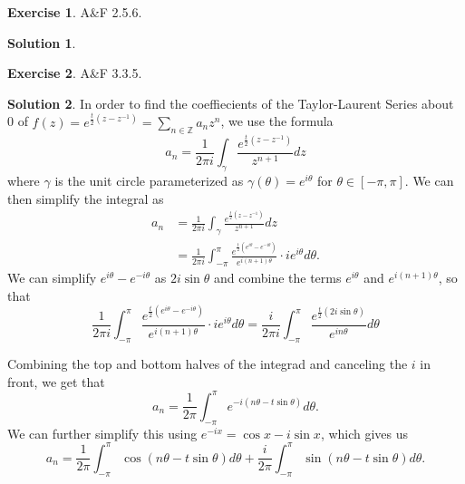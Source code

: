 \documentclass[12pt]{article}
\newcommand{\bbZ}{\mathbb{Z}}
\theoremstyle{definition}
\newtheorem{exer}{Exercise}
\newtheorem{sol}{Solution}
\theoremstyle{remark}
\begin{document}
\newpage

\begin{exer}
    A\&F 2.5.6.
\end{exer}
\begin{sol}

\end{sol}
\newpage

\begin{exer}
    A\&F 3.3.5.
\end{exer}

\begin{sol}
    In order to find the coeffiecients of the Taylor-Laurent Series about 0 of $f(z) = e^{\frac{t}{2}(z - z^{-1})} = \sum_{n\in\bbZ} a_n z^n$, we use the formula
    \begin{equation}
        a_n = \frac{1}{2\pi i} \int_\gamma \frac{ e^{\frac{t}{2}(z - z^{-1})}}{z^{n+1}} dz
    \end{equation}
    where $\gamma$ is the unit circle parameterized as $\gamma(\theta) = e^{i\theta}$ for $\theta \in [-\pi, \pi]$. We can then simplify the integral as
    \begin{align}
        a_n &= \frac{1}{2\pi i} \int_\gamma \frac{ e^{\frac{t}{2}(z - z^{-1})}}{z^{n+1}} dz\\
            &= \frac{1}{2\pi i} \int_{-\pi}^{\pi} \frac{e^{\frac{t}{2}( e^{i\theta} - e^{-i\theta} )}  }{ e^{i(n+1)\theta} } \cdot ie^{i\theta}d\theta.
    \end{align}
    We can simplify $e^{i\theta} - e^{-i\theta}$ as $2i\sin\theta$ and combine the terms $e^{i\theta}$ and $e^{i(n+1) \theta}$, so that
\begin{equation}
  \frac{1}{2\pi i} \int_{-\pi}^{\pi} \frac{e^{\frac{t}{2}( e^{i\theta} - e^{-i\theta} )}  }{ e^{i(n+1)\theta} } \cdot ie^{i\theta}d\theta = \frac{i}{2\pi i} \int_{-\pi}^{\pi} \frac{e^{\frac{t}{2}( 2i\sin\theta )}  }{ e^{in\theta} } d\theta  
\end{equation}

Combining the top and bottom halves of the integrad and canceling the $i$ in front, we get that
\begin{equation}
    a_n = \frac{1}{2\pi} \int_{-\pi}^\pi e^{-i(n\theta - t\sin\theta)}d\theta.
\end{equation}
We can further simplify this using $e^{-ix} = \cos x - i\sin x$, which gives us
\begin{equation}
    a_n = \frac{1}{2\pi}\int_{-\pi}^\pi \cos ( n\theta - t\sin\theta )d\theta +  \frac{i}{2\pi}\int_{-\pi}^{\pi} \sin( n\theta - t\sin\theta ) d\theta.
\end{equation}


\end{sol}
\end{document}
